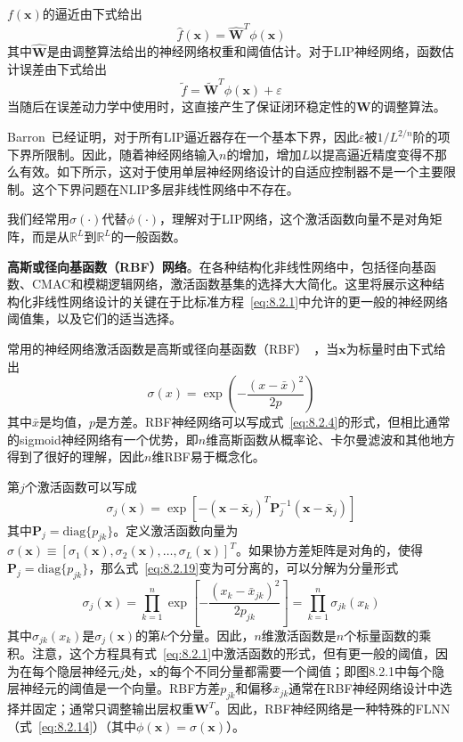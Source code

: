 \documentclass[12pt,a4paper]{ctexart}
\begin{document}
$f(\bm{x})$的逼近由下式给出
\begin{equation}\label{eq:8.2.16}
\hat{f}(\bm{x}) = \hat{\bm{W}}^T \phi(\bm{x})
\end{equation}
其中$\hat{\bm{W}}$是由调整算法给出的神经网络权重和阈值估计。对于LIP神经网络，函数估计误差由下式给出
\begin{equation}\label{eq:8.2.17}
\tilde{f} = \tilde{\bm{W}}^T \phi(\bm{x}) + \varepsilon
\end{equation}
当随后在误差动力学中使用时，这直接产生了保证闭环稳定性的$\bm{W}$的调整算法。

Barron~\cite{barron1993}已经证明，对于所有LIP逼近器存在一个基本下界，因此$\varepsilon$被$1/L^{2/n}$阶的项下界所限制。因此，随着神经网络输入$n$的增加，增加$L$以提高逼近精度变得不那么有效。如下所示，这对于使用单层神经网络设计的自适应控制器不是一个主要限制。这个下界问题在NLIP多层非线性网络中不存在。

我们经常用$\sigma(\cdot)$代替$\phi(\cdot)$，理解对于LIP网络，这个激活函数向量不是对角矩阵，而是从$\mathbb{R}^L$到$\mathbb{R}^L$的一般函数。

\textbf{高斯或径向基函数（RBF）网络}。在各种结构化非线性网络中，包括径向基函数、CMAC和模糊逻辑网络，激活函数基集的选择大大简化。这里将展示这种结构化非线性网络设计的关键在于比标准方程~\eqref{eq:8.2.1}中允许的更一般的神经网络阈值集，以及它们的适当选择。

常用的神经网络激活函数是高斯或径向基函数（RBF）~\cite{sanner1991}，当$\bm{x}$为标量时由下式给出
\begin{equation}\label{eq:8.2.18}
\sigma(x) = \exp\left(-\frac{(x-\bar{x})^2}{2p}\right)
\end{equation}
其中$\bar{x}$是均值，$p$是方差。RBF神经网络可以写成式~\eqref{eq:8.2.4}的形式，但相比通常的sigmoid神经网络有一个优势，即$n$维高斯函数从概率论、卡尔曼滤波和其他地方得到了很好的理解，因此$n$维RBF易于概念化。

第$j$个激活函数可以写成
\begin{equation}\label{eq:8.2.19}
\sigma_j(\bm{x}) = \exp\left[-(\bm{x}-\bar{\bm{x}}_j)^T \bm{P}_j^{-1}(\bm{x}-\bar{\bm{x}}_j)\right]
\end{equation}
其中$\bm{P}_j = \text{diag}\{p_{jk}\}$。定义激活函数向量为$\sigma(\bm{x}) \equiv [\sigma_1(\bm{x}), \sigma_2(\bm{x}), \ldots, \sigma_L(\bm{x})]^T$。如果协方差矩阵是对角的，使得$\bm{P}_j = \text{diag}\{p_{jk}\}$，那么式~\eqref{eq:8.2.19}变为可分离的，可以分解为分量形式
\begin{equation}\label{eq:8.2.20}
\sigma_j(\bm{x}) = \prod_{k=1}^{n} \exp\left[-\frac{(x_k-\bar{x}_{jk})^2}{2p_{jk}}\right] = \prod_{k=1}^{n} \sigma_{jk}(x_k)
\end{equation}
其中$\sigma_{jk}(x_k)$是$\sigma_j(\bm{x})$的第$k$个分量。因此，$n$维激活函数是$n$个标量函数的乘积。注意，这个方程具有式~\eqref{eq:8.2.1}中激活函数的形式，但有更一般的阈值，因为在每个隐层神经元$j$处，$\bm{x}$的每个不同分量都需要一个阈值；即图8.2.1中每个隐层神经元的阈值是一个向量。RBF方差$p_{jk}$和偏移$\bar{x}_{jk}$通常在RBF神经网络设计中选择并固定；通常只调整输出层权重$\bm{W}^T$。因此，RBF神经网络是一种特殊的FLNN（式~\eqref{eq:8.2.14}）（其中$\phi(\bm{x}) = \sigma(\bm{x})$）。
\end{document}

